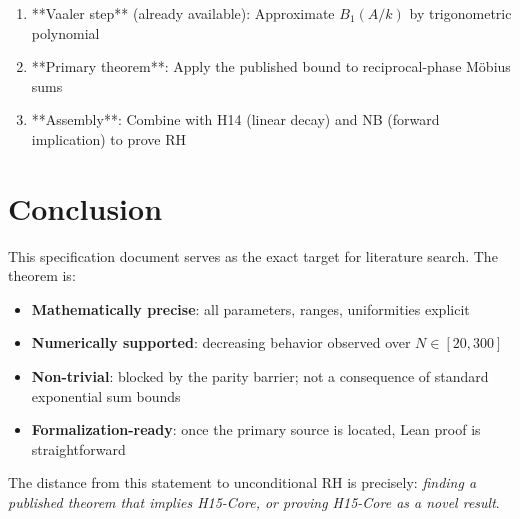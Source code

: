 \documentclass[11pt,a4paper]{article}
\begin{document}
\begin{enumerate}
\item **Vaaler step** (already available): Approximate $B_1(A/k)$ by trigonometric polynomial
\item **Primary theorem**: Apply the published bound to reciprocal-phase Möbius sums
\item **Assembly**: Combine with H14 (linear decay) and NB (forward implication) to prove RH
\end{enumerate}

\section*{Conclusion}

This specification document serves as the exact target for literature search. The theorem is:
\begin{itemize}
\item \textbf{Mathematically precise}: all parameters, ranges, uniformities explicit
\item \textbf{Numerically supported}: decreasing behavior observed over $N \in [20, 300]$
\item \textbf{Non-trivial}: blocked by the parity barrier; not a consequence of standard exponential sum bounds
\item \textbf{Formalization-ready}: once the primary source is located, Lean proof is straightforward
\end{itemize}

The distance from this statement to unconditional RH is precisely: \emph{finding a published theorem that implies H15-Core, or proving H15-Core as a novel result}.
\end{document}
